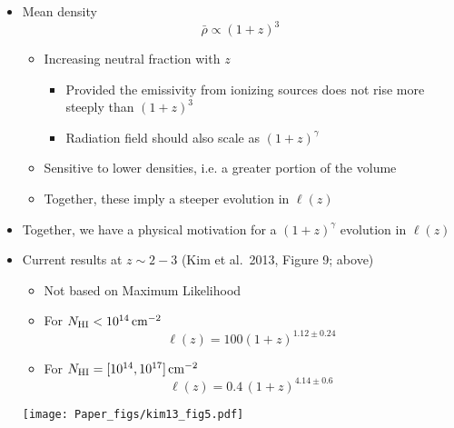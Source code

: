 \documentclass[12pt,letterpaper]{article}
\begin{document}
\begin{Aenumerate}
\begin{itemize}
\begin{itemize}
\begin{itemize}
			\end{itemize}
		\item Mean density
		\begin{equation}
		\bar\rho \propto (1+z)^3
		\end{equation}
			\begin{itemize}
			\item Increasing neutral fraction with $z$ 
				\begin{itemize}
				\item Provided the emissivity from ionizing sources does
				not rise more steeply than $(1+z)^3$
				\item Radiation field should also scale as $(1+z)^\gamma$
				\end{itemize}
			\item Sensitive to lower densities, i.e. a greater portion 
			of the volume
			\item Together, these imply a steeper evolution in $\ell(z)$
			\end{itemize}
		\item Together, we have a physical motivation for a $(1+z)^\gamma$
		evolution in $\ell(z)$

		\item Current results at $z \sim 2-3$  (Kim et al.\ 2013, Figure 9; above)
			\begin{itemize}
			\item Not based on Maximum Likelihood
			\item For $N_{\rm HI} < 10^{14} \, {\rm cm^{-2}}$
			\begin{equation}
			\ell(z) = 100 (1+z)^{1.12 \pm 0.24}
			\end{equation}
			\item For $N_{\rm HI} = [10^{14}, 10^{17}] \, {\rm cm^{-2}}$
			\begin{equation}
			\ell(z) = 0.4 \, (1+z)^{4.14 \pm 0.6}
			\end{equation}
			\end{itemize}

	\texttt{[image: Paper\_figs/kim13\_fig5.pdf]}


\end{itemize}
\end{itemize}
\end{Aenumerate}
\end{document}
